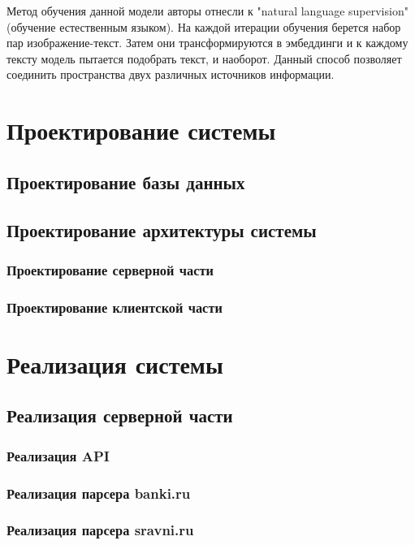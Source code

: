 \documentclass[PI, VKR]{HSEUniversity}
\begin{document}
Метод обучения данной модели авторы отнесли к "natural language supervision" (обучение естественным языком). На каждой итерации обучения берется набор пар изображение-текст. Затем они трансформируются в эмбеддинги и к каждому тексту модель пытается подобрать текст, и наоборот. Данный способ позволяет соединить пространства двух различных источников информации.
\chapter{Проектирование системы}
\label{sec:orgee3d8ba}
\section{Проектирование базы данных}
\label{sec:org723332b}

\section{Проектирование архитектуры системы}
\label{sec:org5f3e812}
\subsection{Проектирование серверной части}
\label{sec:org7d29938}
\subsection{Проектирование клиентской части}
\label{sec:org15da838}

\chapter{Реализация системы}
\label{sec:orgeeb2462}
\section{Реализация серверной части}
\label{sec:org7c9c272}
\subsection{Реализация API}
\label{sec:org99853e4}
\subsection{Реализация парсера banki.ru}
\label{sec:org13fe4cd}
\subsection{Реализация парсера sravni.ru}
\label{sec:orgbafd3ea}
\end{document}
